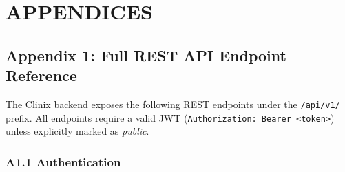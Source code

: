 ﻿%
\appendix

\chapter*{APPENDICES}

\section*{Appendix 1: Full REST API Endpoint Reference}
\label{app:api-reference}

The Clinix backend exposes the following REST endpoints under the
\texttt{/api/v1/} prefix. All endpoints require a valid JWT
(\texttt{Authorization: Bearer <token>}) unless explicitly marked as
\emph{public}.

\subsection*{A1.1 Authentication}

